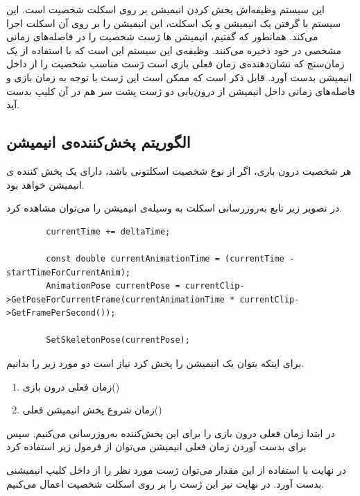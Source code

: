 این سیستم وظیفه‌اش پخش کردن انیمیشن بر روی اسکلت شخصیت است.
این سیستم با گرفتن یک انیمیشن و یک اسکلت، این انیمیشن را بر روی آن اسکلت اجرا می‌کند.
همانطور که گفتیم، انیمیشن ها ژست شخصیت را در فاصله‌های زمانی مشخصی در خود ذخیره ‌می‌کنند. وظیفه‌ی این سیستم این است که با استفاده از یک زمان‌سنج که نشان‌دهنده‌ی زمان فعلی بازی است ژست مناسب شخصیت را از داخل انیمیشن بدست آورد.
قابل ذکر است که ممکن است این ژست با توجه به زمان بازی و فاصله‌های زمانی داخل انیمیشن
از درون‌یابی دو ژست پشت سر هم در آن کلیپ بدست آید.

\subsection{الگوریتم پخش‌کننده‌ی انیمیشن }

هر شخصیت درون بازی، اگر از نوع شخصیت اسکلتونی باشد، دارای یک پخش کننده ی انیمیشن خواهد بود.

در تصویر زیر تابع به‌روزرسانی اسکلت به وسیله‌ی انیمیشن را می‌توان مشاهده کرد.

\begin{latin}
	\begin{lstlisting}
		currentTime += deltaTime;

		const double currentAnimationTime = (currentTime - startTimeForCurrentAnim);
		AnimationPose currentPose = currentClip->GetPoseForCurrentFrame(currentAnimationTime * currentClip->GetFramePerSecond());
		
		SetSkeletonPose(currentPose);
	\end{lstlisting}
\end{latin}	



برای اینکه بتوان یک انیمیشن را پخش کرد نیاز است دو مورد زیر را بدانیم.

\begin{enumerate}
	\item زمان فعلی درون بازی()
	\item زمان شروع پخش انیمیشن فعلی() 
\end{enumerate}

در ابتدا زمان فعلی درون بازی را برای این پخش‌کننده به‌روزرسانی می‌کنیم.
سپس برای بدست آوردن زمان فعلی انیمیشن می‌توان از فرمول زیر استفاده کرد


در نهایت با استفاده از این مقدار می‌توان ژست مورد نظر را از داخل کلیپ انیمیشنی بدست ‌آورد.
در نهایت نیز این ژست را بر روی اسکلت شخصیت اعمال می‌کنیم.


